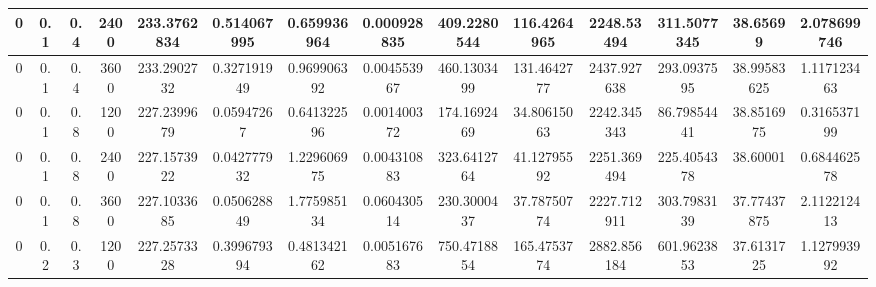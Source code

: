 \documentclass[main.tex]{subfiles}
\begin{document}
\begin{table}[ht]
\begin{tabular}{cccccccccccccc}
		\multicolumn{1}{|c|}{0}  & \multicolumn{1}{c|}{0.1} & \multicolumn{1}{c|}{0.4} & \multicolumn{1}{c|}{2400} & \multicolumn{1}{c|}{233.3762834} & \multicolumn{1}{c|}{0.514067995} & \multicolumn{1}{c|}{0.659936964} & \multicolumn{1}{c|}{0.000928835} & \multicolumn{1}{c|}{409.2280544} & \multicolumn{1}{c|}{116.4264965} & \multicolumn{1}{c|}{2248.53494}  & \multicolumn{1}{c|}{311.5077345} & \multicolumn{1}{c|}{38.65699}    & \multicolumn{1}{c|}{2.078699746} \\ \hline
		\multicolumn{1}{|c|}{0}  & \multicolumn{1}{c|}{0.1} & \multicolumn{1}{c|}{0.4} & \multicolumn{1}{c|}{3600} & \multicolumn{1}{c|}{233.2902732} & \multicolumn{1}{c|}{0.327191949} & \multicolumn{1}{c|}{0.969906392} & \multicolumn{1}{c|}{0.004553967} & \multicolumn{1}{c|}{460.1303499} & \multicolumn{1}{c|}{131.4642777} & \multicolumn{1}{c|}{2437.927638} & \multicolumn{1}{c|}{293.0937595} & \multicolumn{1}{c|}{38.99583625} & \multicolumn{1}{c|}{1.117123463} \\ \hline
		\multicolumn{1}{|c|}{0}  & \multicolumn{1}{c|}{0.1} & \multicolumn{1}{c|}{0.8} & \multicolumn{1}{c|}{1200} & \multicolumn{1}{c|}{227.2399679} & \multicolumn{1}{c|}{0.05947267}  & \multicolumn{1}{c|}{0.641322596} & \multicolumn{1}{c|}{0.001400372} & \multicolumn{1}{c|}{174.1692469} & \multicolumn{1}{c|}{34.80615063} & \multicolumn{1}{c|}{2242.345343} & \multicolumn{1}{c|}{86.79854441} & \multicolumn{1}{c|}{38.8516975}  & \multicolumn{1}{c|}{0.316537199} \\ \hline
		\multicolumn{1}{|c|}{0}  & \multicolumn{1}{c|}{0.1} & \multicolumn{1}{c|}{0.8} & \multicolumn{1}{c|}{2400} & \multicolumn{1}{c|}{227.1573922} & \multicolumn{1}{c|}{0.042777932} & \multicolumn{1}{c|}{1.229606975} & \multicolumn{1}{c|}{0.004310883} & \multicolumn{1}{c|}{323.6412764} & \multicolumn{1}{c|}{41.12795592} & \multicolumn{1}{c|}{2251.369494} & \multicolumn{1}{c|}{225.4054378} & \multicolumn{1}{c|}{38.60001}    & \multicolumn{1}{c|}{0.684462578} \\ \hline
		\multicolumn{1}{|c|}{0}  & \multicolumn{1}{c|}{0.1} & \multicolumn{1}{c|}{0.8} & \multicolumn{1}{c|}{3600} & \multicolumn{1}{c|}{227.1033685} & \multicolumn{1}{c|}{0.050628849} & \multicolumn{1}{c|}{1.775985134} & \multicolumn{1}{c|}{0.060430514} & \multicolumn{1}{c|}{230.3000437} & \multicolumn{1}{c|}{37.78750774} & \multicolumn{1}{c|}{2227.712911} & \multicolumn{1}{c|}{303.7983139} & \multicolumn{1}{c|}{37.77437875} & \multicolumn{1}{c|}{2.112212413} \\ \hline
		\multicolumn{1}{|c|}{0}  & \multicolumn{1}{c|}{0.2} & \multicolumn{1}{c|}{0.3} & \multicolumn{1}{c|}{1200} & \multicolumn{1}{c|}{227.2573328} & \multicolumn{1}{c|}{0.399679394} & \multicolumn{1}{c|}{0.481342162} & \multicolumn{1}{c|}{0.005167683} & \multicolumn{1}{c|}{750.4718854} & \multicolumn{1}{c|}{165.4753774} & \multicolumn{1}{c|}{2882.856184} & \multicolumn{1}{c|}{601.9623853} & \multicolumn{1}{c|}{37.6131725}  & \multicolumn{1}{c|}{1.127993992} \\ \hline

\end{tabular}
\end{table}
\end{document}

